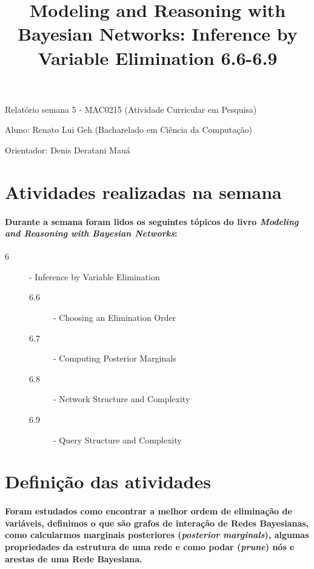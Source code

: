 \documentclass[a4paper,10pt]{article}
\title{\textbf{Modeling and Reasoning with Bayesian Networks: Inference by Variable Elimination 6.6-6.9}}
\theoremstyle{plain}
\begin{document}
\date{}
\author{}
\vspace*{-40pt}
{\let\newpage\relax\maketitle}

Relatório semana 5 - MAC0215 (Atividade Curricular em Pesquisa)

Aluno: Renato Lui Geh (Bacharelado em Ciência da Computação)

Orientador: Denis Deratani Mauá

\section{Atividades realizadas na semana}

\paragraph{
  Durante a semana foram lidos os seguintes tópicos do livro \textit{Modeling and Reasoning with
  Bayesian Networks}\cite{bayes-net-darwiche}:
}

\begin{description}
  \item[6] - Inference by Variable Elimination
  \begin{description}
    \item[6.6] - Choosing an Elimination Order
    \item[6.7] - Computing Posterior Marginals
    \item[6.8] - Network Structure and Complexity
    \item[6.9] - Query Structure and Complexity
  \end{description}
\end{description}

\section{Definição das atividades}

\paragraph{
  Foram estudados como encontrar a melhor ordem de eliminação de variáveis\cite{report-2}, 
  definimos o que são grafos de interação de Redes Bayesianas, como calcularmos marginais
  posteriores (\textit{posterior marginals}), algumas propriedades da estrutura de uma rede e como 
  podar (\textit{prune}) nós e arestas de uma Rede Bayesiana.
}
\end{document}
